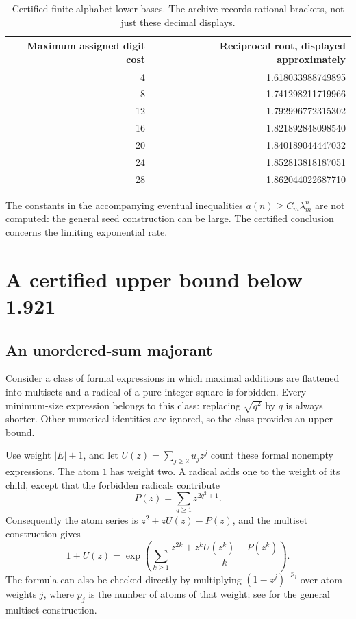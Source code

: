 \documentclass[11pt,letterpaper]{article}
\numberwithin{equation}{section}
\theoremstyle{definition}
\begin{document}
\begin{table}[ht]
\centering
\begin{tabular}{rr}
\toprule
Maximum assigned digit cost & Reciprocal root, displayed approximately\\
\midrule
4  & 1.618033988749895\\
8  & 1.741298211719966\\
12 & 1.792996772315302\\
16 & 1.821892848098540\\
20 & 1.840189044447032\\
24 & 1.852813818187051\\
28 & 1.862044022687710\\
\bottomrule
\end{tabular}
\caption{Certified finite-alphabet lower bases. The archive records rational
brackets, not just these decimal displays.}
\label{tab:lower}
\end{table}

The constants in the accompanying eventual inequalities
$a(n)\ge C_m\lambda_m^n$ are not computed: the general seed construction can
be large. The certified conclusion concerns the limiting exponential rate.

\section{A certified upper bound below 1.921}

\subsection{An unordered-sum majorant}

Consider a class of formal expressions in which maximal additions are
flattened into multisets and a radical of a pure integer square is forbidden.
Every minimum-size expression belongs to this class: replacing
$\sqrt{q^2}$ by $q$ is always shorter. Other numerical identities are ignored,
so the class provides an upper bound.

Use weight $|E|+1$, and let $U(z)=\sum_{j\ge2}u_jz^j$ count these formal
nonempty expressions. The atom $1$ has weight two. A radical adds one to the
weight of its child, except that the forbidden radicals contribute
\begin{equation}\label{eq:P}
 P(z)=\sum_{q\ge1}z^{2q^2+1}.
\end{equation}
Consequently the atom series is $z^2+zU(z)-P(z)$, and the multiset construction
gives
\begin{equation}\label{eq:Ugf}
 1+U(z)=\exp\left(\sum_{k\ge1}
   \frac{z^{2k}+z^kU(z^k)-P(z^k)}k\right).
\end{equation}
The formula can also be checked directly by multiplying
$(1-z^j)^{-p_j}$ over atom weights $j$, where $p_j$ is the number of atoms
of that weight; see \cite[Chapter I]{fs} for the general multiset construction.
\end{document}
